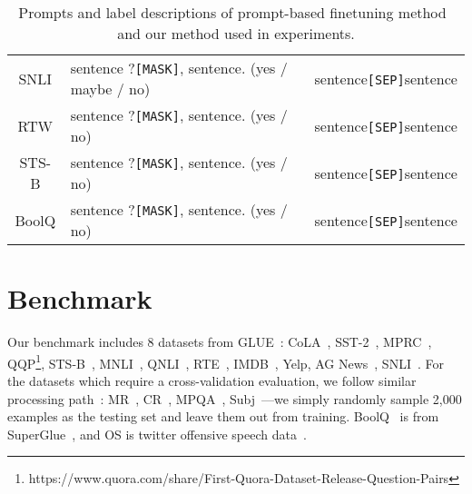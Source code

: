 \documentclass{article}
\begin{document}
\begin{table*}[htb]
{\begin{tabular}{cll}
SNLI & sentence ?\texttt{[MASK]}, sentence. (yes / maybe / no) & sentence\texttt{[SEP]}sentence\\
RTW & sentence ?\texttt{[MASK]}, sentence. (yes / no) & sentence\texttt{[SEP]}sentence\\
STS-B & sentence ?\texttt{[MASK]}, sentence. (yes / no) & sentence\texttt{[SEP]}sentence\\
BoolQ & sentence ?\texttt{[MASK]}, sentence. (yes / no) & sentence\texttt{[SEP]}sentence\\
\bottomrule
\end{tabular}}
\caption{Prompts and label descriptions of prompt-based finetuning method~\citep{gao2020making} and our method used in experiments. }
\label{table:label_prompt}
\end{table*}
\section{Benchmark}
Our benchmark includes 8 datasets from GLUE~\citep{wang2018glue}: CoLA~\citep{warstadt2019neural}, SST-2~\citep{socher2013recursive}, MPRC~\citep{dolan2005automatically}, QQP\footnote{https://www.quora.com/share/First-Quora-Dataset-Release-Question-Pairs}, STS-B~\citep{cer2017semeval}, MNLI~\citep{williams2017broad}, QNLI~\citep{rajpurkar2016squad}, RTE~\citep{dagan2005pascal,haim2006second,giampiccolo2007third, bentivogli2009fifth}, IMDB~\citep{maas2011learning}, Yelp, AG News~\citep{zhang2015character}, SNLI~\citep{bowman2015large}. For the datasets which require a cross-validation evaluation, we follow similar processing path~\citep{gao2020making}: MR~\citep{pang2005seeing}, CR~\citep{hu2004mining}, MPQA~\citep{wiebe2004annotating}, Subj~\citep{pang2004sentimental}—we simply randomly sample 2,000 examples as the testing set and leave them out from training. BoolQ~\citep{clark2019boolq} is from SuperGlue~\citep{wang2019superglue}, and OS is twitter offensive speech data~\citep{davidson2017automated}.
\end{document}
